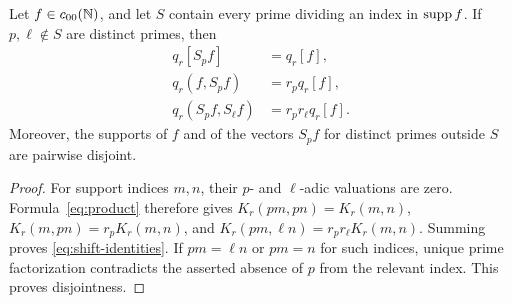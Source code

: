 \begin{lemma}
\label{lem:shifts}
Let $f\in c_{00}(\mathbb{N})$, and let $S$ contain every prime dividing an index in
$\operatorname{supp} f$. If $p,\ell\notin S$ are distinct primes, then
\begin{equation}
 \begin{split}
 q_r[S_pf]&=q_r[f],\\
 q_r(f,S_pf)&=r_pq_r[f],\\
 q_r(S_pf,S_\ell f)&=r_pr_\ell q_r[f].
 \end{split}
 \label{eq:shift-identities}
\end{equation}
Moreover, the supports of $f$ and of the vectors $S_pf$ for distinct
primes outside $S$ are pairwise disjoint.
\end{lemma}
\begin{proof}
For support indices $m,n$, their $p$- and $\ell$-adic valuations are zero.
Formula~\eqref{eq:product} therefore gives
$K_r(pm,pn)=K_r(m,n)$,
$K_r(m,pn)=r_pK_r(m,n)$, and
$K_r(pm,\ell n)=r_pr_\ell K_r(m,n)$.
Summing proves \eqref{eq:shift-identities}. If $pm=\ell n$ or $pm=n$
for such indices, unique prime factorization contradicts the asserted
absence of $p$ from the relevant index. This proves disjointness.
\end{proof}

